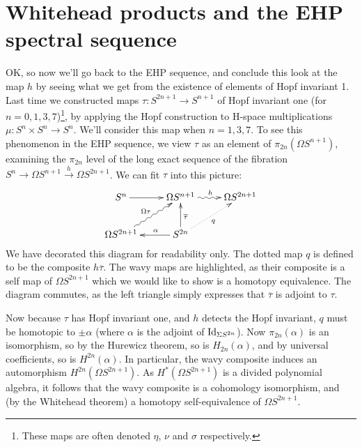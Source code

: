 \documentclass{article}
\providecommand{\OutputWhiteheadProductsAndTheEHPSS}{16}
\newcommand{\Loops}{\Omega}
\renewcommand{\to}{\longrightarrow}
\theoremstyle{definition}
\begin{document}
\section{Whitehead products and the EHP spectral sequence} %
\label{WhiteheadProductsAndTheEHPSS}
\ifx\OutputWhiteheadProductsAndTheEHPSS\undefined\else
OK, so now we'll go back to the EHP sequence, and conclude this look at the map $h$ by seeing what we get from the existence of elements of Hopf invariant 1.  Last time we constructed maps $\tau: S^{2n+1} \to S^{n+1}$ of Hopf invariant one (for $n=0,1,3,7$)\footnote{These maps are often denoted $\eta$, $\nu$ and $\sigma$ respectively.}, by applying the Hopf construction to H-space multiplications $\mu:S^n \times S^n \to S^n$.  We'll consider this map when $n=1,3,7$. To see this phenomenon in the EHP sequence, we view $\tau$ as an element of $\pi_{2n}(\Omega S^{n+1})$, examining the $\pi_{2n}$ level of the long exact sequence of the fibration $S^{n} \to \Loops S^{n+1} \stackrel{h}{\to} \Loops S^{2n+1}$.  We can fit $\tau$ into this picture:
\[\xymatrix{
S^n\ar[r]&\Omega S^{n+1}\ar@{~>}[r]^h&\Omega S^{2n+1}\\
\Omega S^{2n+1}\ar@{~>}[ur]^{\Omega\tau}&S^{2n}\ar[l]_{\ \ \ \alpha}\ar[u]_{\overline\tau}\ar@{..>}[ur]_q
}\]
We have decorated this diagram for readability only. The dotted map $q$ is defined to be the composite $h\overline\tau$. The wavy maps are highlighted, as their composite is a self map of $\Omega S^{2n+1}$ which we would like to show is a homotopy equivalence. The diagram commutes, as the left triangle simply expresses that $\overline\tau$ is adjoint to $\tau$.

Now because $\tau$ has Hopf invariant one, and $h$ detects the Hopf invariant, $q$ must be homotopic to $\pm\alpha$ (where $\alpha$ is the adjoint of $\textup{Id}_{\Sigma S^{2n}}$). Now $\pi_{2n}(\alpha)$ is an isomorphism, so by the Hurewicz theorem, so is $H_{2n}(\alpha)$, and by universal coefficients, so is $H^{2n}(\alpha)$. In particular, the wavy composite induces an automorphism $H^{2n}(\Omega S^{2n+1})$. As $H^*(\Omega S^{2n+1})$ is a divided polynomial algebra, it follows that the wavy composite is a cohomology isomorphism, and (by the Whitehead theorem) a homotopy self-equivalence
of $\Omega S^{2n+1}$.
\end{document}
